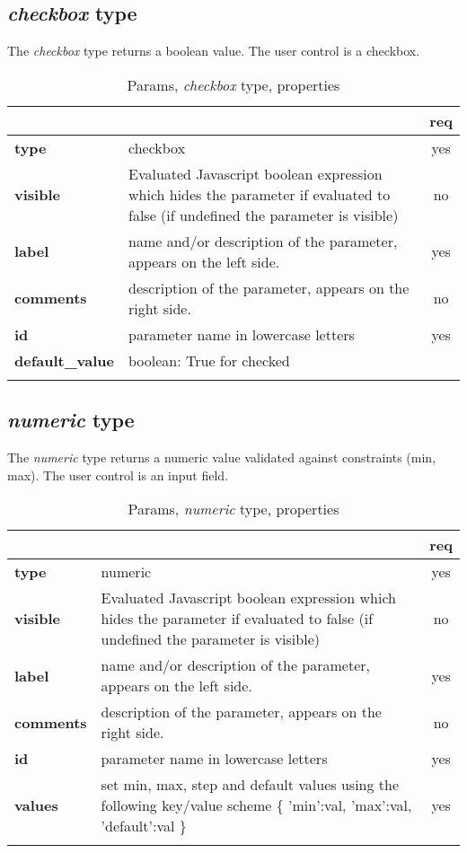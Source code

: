\subsection{ \emph{checkbox} type}

The \emph{checkbox} type returns a boolean value. The user control is a checkbox.


\begin{longtable}{|>{\bf}L{\linewidth}|L{\linewidth}|c|}
\hline
      &  & {\bf req} 
\tabularnewline \hline \hline
 type  & checkbox  & yes \\ \hline
 visible  & Evaluated Javascript boolean expression which hides the parameter if
            evaluated to false (if undefined the parameter is visible)& no \\ \hline
 label  & name and/or description of the parameter, appears on the left side. & yes
                      \\ \hline
 comments & description of the parameter, appears on the right side. & no
                      \\ \hline
 id         & parameter name in lowercase letters  & yes \\ \hline
 default\_value & boolean: True for checked & \\ \hline
\caption{Params, \emph{checkbox} type, properties}
\end{longtable}

\subsection{ \emph{numeric} type}

The \emph{numeric} type returns a numeric value validated against constraints (min, max). The user control is an input field.

\begin{longtable}{|>{\bf}L{\linewidth}|L{\linewidth}|c|}
\hline
      &  & {\bf req} 
\tabularnewline \hline \hline
 type       & numeric   & yes \\ \hline
 visible    & Evaluated Javascript boolean expression which hides the parameter
              if evaluated to false (if undefined the parameter is visible) & no \\ \hline
 label      & name and/or description of the parameter, appears on the left side. & yes \\ \hline
 comments   & description of the parameter, appears on the right side. & no  \\ \hline
 id         & parameter name in lowercase letters & yes \\ \hline
 values     & set min, max, step and default values using the following key/value scheme \{ 'min':val, 'max':val, 'default':val \} & yes \\ \hline
\caption{Params, \emph{numeric} type, properties}
\end{longtable}


